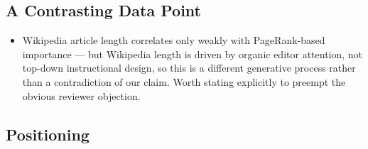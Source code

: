 \subsection{A Contrasting Data Point}
\begin{itemize}
    \item Wikipedia article length correlates only weakly with PageRank-based
          importance \cite{wikipagerank2016} --- but Wikipedia length is driven by
          organic editor attention, not top-down instructional design, so this is a
          different generative process rather than a contradiction of our claim.
          Worth stating explicitly to preempt the obvious reviewer objection.
\end{itemize}

\subsection{Positioning}
